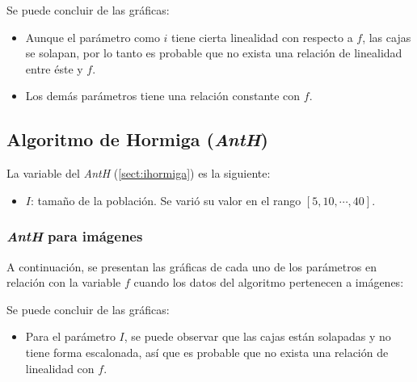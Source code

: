     Se puede concluir de las gráficas:
\begin{itemize}
	\item Aunque el parámetro como $i$ tiene cierta linealidad con
respecto a $f$, las cajas se solapan, por lo tanto es probable
que no exista una relación de linealidad entre éste y $f$.
	\item Los demás parámetros tiene una relación constante con
$f$.
\end{itemize}

\subsection{Algoritmo de Hormiga (\emph{AntH})}\label{sect:iant-rv}

    La variable del \emph{AntH} (\ref{sect:ihormiga}) es la siguiente:
\begin{itemize}
    \item $I$: tamaño de la población. Se varió su valor en el rango
$[5, 10, \cdots, 40]$.
\end{itemize}

\subsubsection{\emph{AntH} para imágenes}

	A continuación, se presentan las gráficas de cada uno de los
parámetros en relación con la variable $f$ cuando los datos
del algoritmo pertenecen a imágenes:

\begin{figure}[H]
  \centering
  \label{fig:f_ant}
\end{figure}

    Se puede concluir de las gráficas:
\begin{itemize}
    \item Para el parámetro $I$, se puede observar que las cajas están solapadas
y no tiene forma escalonada, así que es probable que no exista
una relación de linealidad con $f$.
\end{itemize}

